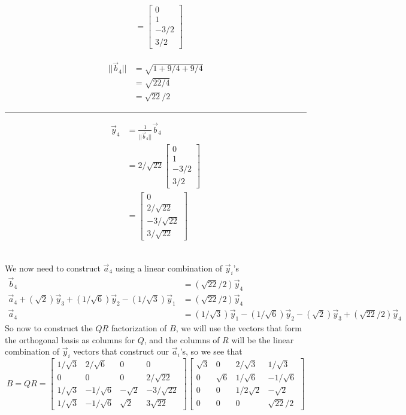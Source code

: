 \documentclass{report}
\begin{document}
\begin{minipage}{0.45\textwidth}
$$\begin{aligned}
&=\begin{bmatrix}0\\1\\-3/2\\3/2\end{bmatrix}
\end{aligned}
$$
\end{minipage}
\begin{minipage}{0.45\textwidth}
$$
\begin{aligned}
||\vec{b}_4||&=\sqrt{1+9/4+9/4}\\
&=\sqrt{22/4}\\
&=\sqrt{22}/2
\end{aligned}
$$
\hrule
\vspace{0.5em}
$$
\begin{aligned}
\vec{y}_4&=\frac{1}{||\vec{b}_4||}\vec{b}_4\\
&=2/\sqrt{22}\begin{bmatrix}0\\1\\-3/2\\3/2\end{bmatrix}\\
&=\begin{bmatrix}0\\2/\sqrt{22}\\-3/\sqrt{22}\\3/\sqrt{22}\end{bmatrix}
\end{aligned}
$$
\end{minipage}\\
We now need to construct $\vec{a}_4$ using a linear combination of $\vec{y}_i$'s
$$
\begin{aligned}
\vec{b}_4&=(\sqrt{22}/2)\vec{y}_4\\
\vec{a}_4 +(\sqrt{2})\vec{y}_3+(1/\sqrt{6})\vec{y}_2-(1/\sqrt{3})\vec{y}_1&=(\sqrt{22}/2)\vec{y}_4\\
\vec{a}_4 &= (1/\sqrt{3})\vec{y}_1 - (1/\sqrt{6})\vec{y}_2 - (\sqrt{2})\vec{y}_3 + (\sqrt{22}/2)\vec{y}_4
\end{aligned}
$$
So now to construct the $QR$ factorization of $B$,  we will use the vectors that form the orthogonal basis as columns for $Q$,  and the columns of $R$ will be the linear combination of $\vec{y}_i$ vectors that construct our $\vec{a}_i$'s,  so we see that
$$
B = QR = \begin{bmatrix} 
1/\sqrt{3}&2/\sqrt{6}&0&0\\
0&0&0&2/\sqrt{22}\\
1/\sqrt{3}&-1/\sqrt{6}&-\sqrt{2}&-3/\sqrt{22}\\
1/\sqrt{3}&-1/\sqrt{6}&\sqrt{2}&3\sqrt{22}
\end{bmatrix}\begin{bmatrix}
\sqrt{3}&0&2/\sqrt{3}&1/\sqrt{3}\\
0&\sqrt{6}&1/\sqrt{6}&-1/\sqrt{6}\\
0&0&1/2\sqrt{2}&-\sqrt{2}\\
0&0&0&\sqrt{22}/2
\end{bmatrix}
$$
\end{document}
